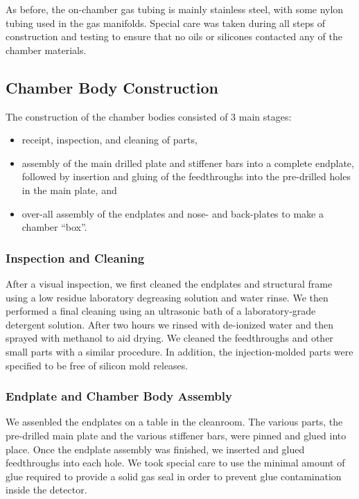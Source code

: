 As before, the on-chamber gas tubing is mainly stainless steel, with some
nylon tubing used in the gas manifolds.  Special care was taken during
all steps of construction and testing to ensure that no oils or
silicones contacted any of the chamber materials.

\subsection{Chamber Body Construction}

The construction of the chamber bodies consisted of 3 main stages:
\begin{itemize}
\item receipt, inspection, and cleaning of parts,
\item assembly of the main drilled plate and stiffener bars into a complete endplate,
followed by insertion and gluing of the feedthroughs into the pre-drilled holes 
in the main plate, and 
\item over-all assembly of the endplates and nose- and back-plates to make
a chamber ``box''.
\end{itemize}

\subsubsection{Inspection and Cleaning}

After a visual inspection, we first cleaned the endplates and structural 
frame using a low residue laboratory degreasing solution and water rinse.
We then performed a final cleaning using an ultrasonic bath of a laboratory-grade detergent solution.  
After two hours we rinsed with de-ionized water and then sprayed 
with methanol to aid drying.
We cleaned the feedthroughs and other small parts with a similar procedure.
In addition, the injection-molded parts were specified to be free of silicon 
mold releases.
 
\subsubsection{Endplate and Chamber Body Assembly}

We assenbled the endplates on a table in the cleanroom.  The various parts,
the pre-drilled main plate and the various stiffener bars, were pinned
and glued into place.  Once the endplate assembly was finished,
we inserted and glued feedthroughs into each hole.  We took special care 
to use the minimal amount of glue required to provide a solid gas 
seal in order to prevent glue contamination inside the detector. 

